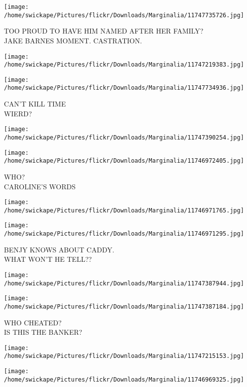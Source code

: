 \documentclass[10pt,letterpaper]{article}
\begin{document}
\vspace{0.25in}
\texttt{[image: /home/swickape/Pictures/flickr/Downloads/Marginalia/11747735726.jpg]}

TOO PROUD TO HAVE HIM NAMED AFTER HER FAMILY?\\
JAKE BARNES MOMENT. CASTRATION.
\pagebreak

\texttt{[image: /home/swickape/Pictures/flickr/Downloads/Marginalia/11747219383.jpg]}

\vspace{0.25in}
\texttt{[image: /home/swickape/Pictures/flickr/Downloads/Marginalia/11747734936.jpg]}

CAN'T KILL TIME\\
WIERD?
\pagebreak

\texttt{[image: /home/swickape/Pictures/flickr/Downloads/Marginalia/11747390254.jpg]}

\vspace{0.25in}
\texttt{[image: /home/swickape/Pictures/flickr/Downloads/Marginalia/11746972405.jpg]}

WHO?\\
CAROLINE'S WORDS
\pagebreak

\texttt{[image: /home/swickape/Pictures/flickr/Downloads/Marginalia/11746971765.jpg]}

\vspace{0.25in}
\texttt{[image: /home/swickape/Pictures/flickr/Downloads/Marginalia/11746971295.jpg]}

BENJY KNOWS ABOUT CADDY.\\
WHAT WON'T HE TELL??
\pagebreak

\texttt{[image: /home/swickape/Pictures/flickr/Downloads/Marginalia/11747387944.jpg]}

\vspace{0.25in}
\texttt{[image: /home/swickape/Pictures/flickr/Downloads/Marginalia/11747387184.jpg]}

WHO CHEATED?\\
IS THIS THE BANKER?
\pagebreak

\texttt{[image: /home/swickape/Pictures/flickr/Downloads/Marginalia/11747215153.jpg]}

\vspace{0.25in}
\texttt{[image: /home/swickape/Pictures/flickr/Downloads/Marginalia/11746969325.jpg]}
\end{document}
